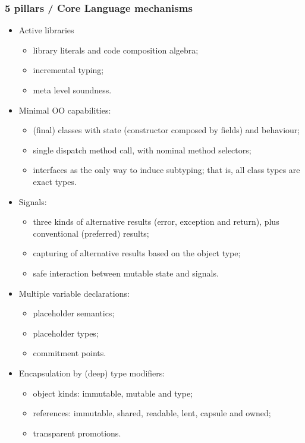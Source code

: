 \begin{frame}[fragile]
\addtocounter{framenumber}{-1}
\frametitle{5 pillars / Core Language mechanisms}
\begin{itemize}
\tiny
\item Active libraries
\begin{itemize}
\tiny
\item library literals and code composition algebra;
\item incremental typing;
\item meta level soundness.
\end{itemize}

\item Minimal OO capabilities:
\begin{itemize}
\tiny
\item (final) classes with state (constructor composed by fields) and behaviour;
\item single dispatch method call, with nominal method selectors;
\item interfaces as the only way to induce subtyping; that is, all class types are exact types.
\end{itemize}
\item Signals:
\begin{itemize}
\tiny
\item three kinds of alternative results (error, exception and return), plus conventional (preferred) results;
\item capturing of alternative results based on the object type;
\item safe interaction between mutable state and signals.
\end{itemize}

\item Multiple variable declarations:
\begin{itemize}
\tiny
\item placeholder semantics;
\item placeholder types;
\item commitment points.
\end{itemize}

\item Encapsulation by (deep) type modifiers:
\begin{itemize}
\tiny
\item object kinds: immutable, mutable and type;
\item references: immutable, shared, readable, lent, capsule and owned;
\item transparent promotions.
\end{itemize}

\end{itemize}
\end{frame}



